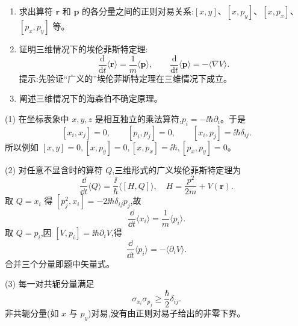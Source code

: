\begin{question}
\begin{enumerate}
\item 求出算符 $\mathbf r$ 和 $\mathbf p$ 的各分量之间的正则对易关系:$[x,y]$、$[x,p_y]$、$[x,p_x]$、$[p_x,p_y]$ 等。
\item 证明三维情况下的埃伦菲斯特定理:
\[
\frac{\mathrm d}{\mathrm dt}\langle \mathbf r\rangle=\frac1m\langle \mathbf p\rangle,
\qquad
\frac{\mathrm d}{\mathrm dt}\langle \mathbf p\rangle=-\langle \nabla V\rangle .
\]
提示:先验证“广义的”埃伦菲斯特定理在三维情况下成立。
\item 阐述三维情况下的海森伯不确定原理。
\end{enumerate}
\begin{solution}

(1) 在坐标表象中 $x,y,z$ 是相互独立的乘法算符,$p_i=-\ii\hbar\partial_i$。于是
\[
[x_i,x_j]=0,\qquad [p_i,p_j]=0,\qquad [x_i,p_j]=\ii\hbar\delta_{ij}.
\]
所以例如 $[x,y]=0,[x,p_y]=0,[x,p_x]=\ii\hbar,[p_x,p_y]=0$。

(2) 对任意不显含时的算符 $Q$,三维形式的广义埃伦菲斯特定理为
\[
\frac{\dd}{\dd t}\langle Q\rangle=\frac{\ii}{\hbar}\langle[H,Q]\rangle,
\quad H=\frac{p^2}{2m}+V(\mathbf r).
\]
取 $Q=x_i$ 得 $[p_j^2,x_i]=-2\ii\hbar\delta_{ij}p_j$,故
\[
\frac{\dd}{\dd t}\langle x_i\rangle=\frac{1}{m}\langle p_i\rangle.
\]
取 $Q=p_i$,因 $[V,p_i]=\ii\hbar\partial_iV$,得
\[
\frac{\dd}{\dd t}\langle p_i\rangle=-\langle\partial_iV\rangle.
\]
合并三个分量即题中矢量式。

(3) 每一对共轭分量满足
\[
\sigma_{x_i}\sigma_{p_j}\ge \frac{\hbar}{2}\delta_{ij}.
\]
非共轭分量(如 $x$ 与 $p_y$)对易,没有由正则对易子给出的非零下界。

\end{solution}
\end{question}

